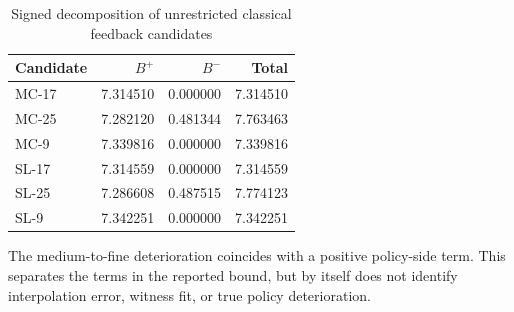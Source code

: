 \begin{table}[htbp]
\centering\small
\caption{Signed decomposition of unrestricted classical feedback candidates}\label{tab:r19classical}
\begin{tabular}{lrrr}\toprule
Candidate & $B^+$ & $B^-$ & Total\\
\midrule
MC-17 & 7.314510 & 0.000000 & 7.314510\\
MC-25 & 7.282120 & 0.481344 & 7.763463\\
MC-9 & 7.339816 & 0.000000 & 7.339816\\
SL-17 & 7.314559 & 0.000000 & 7.314559\\
SL-25 & 7.286608 & 0.487515 & 7.774123\\
SL-9 & 7.342251 & 0.000000 & 7.342251\\
\bottomrule
\end{tabular}
\par\smallskip\begin{minipage}{.98\textwidth}\footnotesize The medium-to-fine deterioration coincides with a positive policy-side term. This separates the terms in the reported bound, but by itself does not identify interpolation error, witness fit, or true policy deterioration.\end{minipage}
\end{table}
